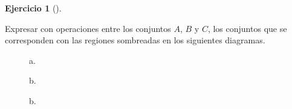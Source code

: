 \documentclass[
  a4paper,
]{scrreport}
\theoremstyle{definition}
\newtheorem{exercise}{Ejercicio}[chapter]
\theoremstyle{remark}
\begin{document}
\begin{tcolorbox}
\begin{tcolorbox}
\begin{tcolorbox}
\end{tcolorbox}

\begin{exercise}[]\protect\hypertarget{exr-expresion-conjuntos}{}\label{exr-expresion-conjuntos}

Expresar con operaciones entre los conjuntos \(A\), \(B\) y \(C\), los
conjuntos que se corresponden con las regiones sombreadas en los
siguientes diagramas.

\end{exercise}

\begin{figure}

\begin{minipage}[t]{0.33\linewidth}

{\centering 

\raisebox{-\height}{



}

\caption{a.}

}

\end{minipage}%
%
\begin{minipage}[t]{0.33\linewidth}

{\centering 

\raisebox{-\height}{



}

\caption{b.}

}

\end{minipage}%
%
\begin{minipage}[t]{0.33\linewidth}

{\centering 

\raisebox{-\height}{



}

\caption{b.}

}

\end{minipage}%

\end{figure}


\end{tcolorbox}
\end{tcolorbox}
\end{document}
